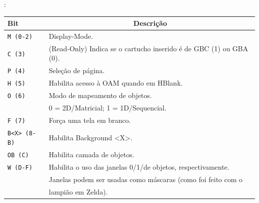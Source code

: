 \documentclass{beamer}
\begin{document}
\begin{darkframes}
\begin{frame}{\secname: \subsecname}
        \scriptsize{\begin{center}
            \begin{tabular}{|l|l|}
                \hline
                Bit & \multicolumn{1}{|c|}{Descrição} \\\hline
                \texttt{M (0-2)} & Display-Mode. \\\hline
                \texttt{C (3)} & (Read-Only) Indica se o cartucho inserido é de GBC (1) ou GBA (0). \\\hline
                \texttt{P (4)} & Seleção de página. \\\hline
                \texttt{H (5)} & Habilita acesso à OAM quando em HBlank. \\\hline
                \texttt{O (6)} & Modo de mapeamento de objetos.\\
                               & 0 = 2D/Matricial; 1 = 1D/Sequencial. \\\hline
                \texttt{F (7)} & Força uma tela em branco. \\\hline
                \texttt{B<X> (8-B)} & Habilita Background <X>. \\\hline
                \texttt{OB (C)} & Habilita camada de objetos. \\\hline
                \texttt{W (D-F)} & Habilita o uso das janelas 0/1/de objetos, respectivamente. \\
                                 & Janelas podem ser usadas como máscaras (como foi feito com o \\
                                 & lampião em Zelda). \\\hline
            \end{tabular}
        \end{center}}
    \end{frame}

\end{darkframes}
\end{document}
